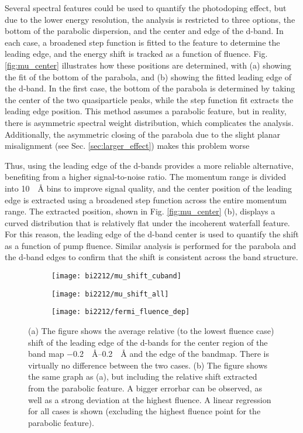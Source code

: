 Several spectral features could be used to quantify the photodoping effect, but due to the lower energy resolution, the analysis is restricted to three options, the bottom of the parabolic dispersion, and the center and edge of the  d-band.
In each case, a broadened step function is fitted to the feature to determine the leading edge, and the energy shift is tracked as a function of fluence.
Fig. \ref{fig:mu_center} illustrates how these positions are determined, with (a) showing the fit of the bottom of the parabola, and (b) showing the fitted leading edge of the  d-band.
In the first case, the bottom of the parabola is determined by taking the center of the two quasiparticle peaks, while the step function fit extracts the leading edge position.
This method assumes a parabolic feature, but in reality, there is asymmetric spectral weight distribution, which complicates the analysis.
Additionally, the asymmetric closing of the parabola due to the slight planar misalignment (see Sec. \ref{sec:larger_effect}) makes this problem worse

Thus, using the leading edge of the  d-bands provides a more reliable alternative, benefiting from a higher signal-to-noise ratio.
The momentum range is divided into \qty{10}{\per\angstrom} bins to improve signal quality, and the center position of the leading edge is extracted using a broadened step function across the entire momentum range.
The extracted position, shown in Fig. \ref{fig:mu_center} (b), displays a curved distribution that is relatively flat under the incoherent waterfall feature.
For this reason, the leading edge of the  d-band center is used to quantify the shift as a function of pump fluence.
Similar analysis is performed for the parabola and the d-band edges to confirm that the shift is consistent across the band structure.

\begin{figure}[b!]
	\centering
	\begin{subfigure}[b]{0.33\textwidth}
		\texttt{[image: bi2212/mu\_shift\_cuband]}
		\caption{}
	\end{subfigure}
	\begin{subfigure}[b]{0.33\textwidth}
		\texttt{[image: bi2212/mu\_shift\_all]}
		\caption{}
	\end{subfigure}
	\begin{subfigure}[b]{0.33\textwidth}
		\texttt{[image: bi2212/fermi\_fluence\_dep]}
		\caption{}
	\end{subfigure}
	\caption{(a) The figure shows the average relative (to the lowest fluence case) shift of the leading edge of the  d-bands for the center region of the band map \qtyrange{-0.2}{0.2}{\per\angstrom} and the edge of the bandmap. There is virtually no difference between the two cases. (b) The figure shows the same graph as (a), but including the relative shift extracted from the parabolic feature. A bigger errorbar can be observed, as well as a strong deviation at the highest fluence. A linear regression for all cases is shown (excluding the highest fluence point for the parabolic feature).}
	\label{fig:mu_shift}
\end{figure}

